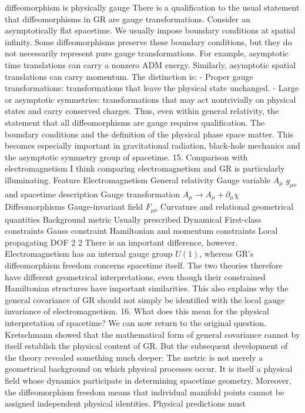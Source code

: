 diffeomorphism is physically gauge There is a qualification to the usual
statement that diffeomorphisms in GR are gauge transformations. Consider an
asymptotically flat spacetime. We usually impose boundary conditions at spatial
infinity. Some diffeomorphisms preserve these boundary conditions, but they do
not necessarily represent pure gauge transformations. For example, asymptotic
time translations can carry a nonzero ADM energy. Similarly, asymptotic spatial
translations can carry momentum. The distinction is: - Proper gauge
transformations: transformations that leave the physical state unchanged. -
Large or asymptotic symmetries: transformations that may act nontrivially on
physical states and carry conserved charges. Thus, even within general
relativity, the statement that all diffeomorphisms are gauge requires
qualification. The boundary conditions and the definition of the physical phase
space matter. This becomes especially important in gravitational radiation,
black-hole mechanics and the asymptotic symmetry group of spacetime. 15.
Comparison with electromagnetism I think comparing electromagnetism and GR is
particularly illuminating. Feature	Electromagnetism	General relativity
Gauge variable	\(A_\mu\)	\(g_{\mu\nu}\) and spacetime description Gauge
transformation	\(A_\mu\to A_\mu+\partial_\mu\chi\)	Diffeomorphisms
Gauge-invariant field	\(F_{\mu\nu}\)	Curvature and relational geometrical
quantities Background metric	Usually prescribed	Dynamical First-class
constraints	Gauss constraint	Hamiltonian and momentum constraints Local
propagating DOF	2	2 There is an important difference, however.
Electromagnetism has an internal gauge group \(U(1)\), whereas GR's
diffeomorphism freedom concerns spacetime itself. The two theories therefore
have different geometrical interpretations, even though their constrained
Hamiltonian structures have important similarities. This also explains why the
general covariance of GR should not simply be identified with the local gauge
invariance of electromagnetism. 16. What does this mean for the physical
interpretation of spacetime? We can now return to the original question.
Kretschmann showed that the mathematical form of general covariance cannot by
itself establish the physical content of GR. But the subsequent development of
the theory revealed something much deeper: The metric is not merely a
geometrical background on which physical processes occur. It is itself a
physical field whose dynamics participate in determining spacetime geometry.
Moreover, the diffeomorphism freedom means that individual manifold points
cannot be assigned independent physical identities. Physical predictions must
